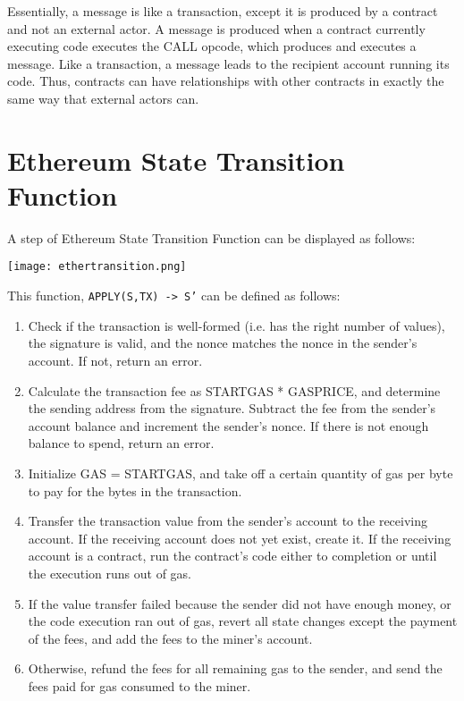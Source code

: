 Essentially, a message is like a transaction, except it is produced by a contract and not an external actor. A message is produced when a contract currently executing code executes the CALL opcode, which produces and executes a message. \newline
Like a transaction, a message leads to the recipient account running its code. Thus, contracts can have relationships with other contracts in exactly the same way that external actors can.

\section{Ethereum State Transition Function}
A step of Ethereum State Transition Function can be displayed as follows:
\begin{center}
    \texttt{[image: ethertransition.png]}
\end{center}
This function, \texttt{APPLY(S,TX) -> S'} can be defined as follows:
\begin{enumerate}
    \item Check if the transaction is well-formed (i.e. has the right number of values), the signature is valid, and the nonce matches the nonce in the sender's account. If not, return an error.
    \item Calculate the transaction fee as STARTGAS * GASPRICE, and determine the sending address from the signature. Subtract the fee from the sender's account balance and increment the sender's nonce. If there is not enough balance to spend, return an error.
    \item Initialize GAS = STARTGAS, and take off a certain quantity of gas per byte to pay for the bytes in the transaction.
    \item Transfer the transaction value from the sender's account to the receiving account. If the receiving account does not yet exist, create it. If the receiving account is a contract, run the contract's code either to completion or until the execution runs out of gas.
    \item If the value transfer failed because the sender did not have enough money, or the code execution ran out of gas, revert all state changes except the payment of the fees, and add the fees to the miner's account.
    \item Otherwise, refund the fees for all remaining gas to the sender, and send the fees paid for gas consumed to the miner.
\end{enumerate}


